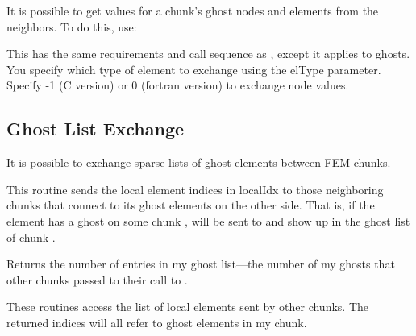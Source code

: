 \documentclass[10pt]{article}
\begin{document}
It is possible to get values for a chunk's ghost nodes and elements from the neighbors. To do this, use:


This has the same requirements and call sequence as , except it applies to ghosts. You specify which type of element to exchange using the elType parameter. Specify -1 (C version) or 0 (fortran version) to exchange node values.  


\subsection{Ghost List Exchange}

It is possible to exchange sparse lists of ghost elements between FEM chunks.


This routine sends the local element indices in localIdx to those neighboring chunks that connect to its ghost elements on the other side.  That is, if the element
 has a ghost on some chunk ,  will be sent to 
and show up in the ghost list of chunk .

Returns the number of entries in my ghost list---the number of my ghosts that
other chunks passed to their call to .


These routines access the list of local elements sent by other chunks.  
The returned indices will all refer to ghost elements in my chunk.



%   



\end{document}
